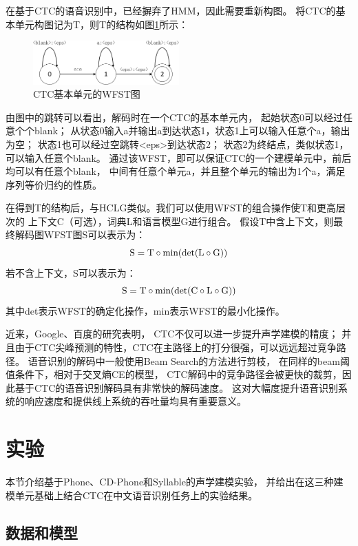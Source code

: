 在基于CTC的语音识别中，已经摒弃了HMM，因此需要重新构图。
将CTC的基本单元构图记为T，则T的结构如图\ref{fig:t}所示：
\begin{figure}[htbp]
\centering
\includegraphics[width=0.5\textwidth]{figures/chapter4/t-crop}
\caption{CTC基本单元的WFST图}
\label{fig:t}
\end{figure}
由图中的跳转可以看出，解码时在一个CTC的基本单元内，
起始状态0可以经过任意个个blank；
从状态0输入a并输出a到达状态1，状态1上可以输入任意个a，输出为空；
状态1也可以经过空跳转<eps>到达状态2；
状态2为终结点，类似状态1，可以输入任意个blank。
通过该WFST，即可以保证CTC的一个建模单元中，前后均可以有任意个blank，
中间有任意个单元a，并且整个单元的输出为1个a，满足序列等价归约的性质。

在得到T的结构后，与HCLG类似。我们可以使用WFST的组合操作使T和更高层次的
上下文C（可选），词典L和语言模型G进行组合。
假设T中含上下文，则最终解码图WFST图S可以表示为：
\begin{equation}
{\rm{S = T}} \circ {\rm{min(det(L}} \circ {\rm{G))}}
\end{equation}
若不含上下文，S可以表示为：
\begin{equation}
{\rm{S = T}} \circ {\rm{min(det(C}} \circ {\rm{L}} \circ {\rm{G))}}
\end{equation}
其中det表示WFST的确定化操作，min表示WFST的最小化操作。

近来，Google、百度的研究表明，
CTC不仅可以进一步提升声学建模的精度；
并且由于CTC尖峰预测的特性，CTC在主路径上的打分很强，可以远远超过竞争路径。
语音识别的解码中一般使用Beam Search的方法进行剪枝，
在同样的beam阈值条件下，相对于交叉熵CE的模型，
CTC解码中的竞争路径会被更快的裁剪，因此基于CTC的语音识别解码具有非常快的解码速度。
这对大幅度提升语音识别系统的响应速度和提供线上系统的吞吐量均具有重要意义。

\section{实验}

本节介绍基于Phone、CD-Phone和Syllable的声学建模实验，
并给出在这三种建模单元基础上结合CTC在中文语音识别任务上的实验结果。

\subsection{数据和模型}

